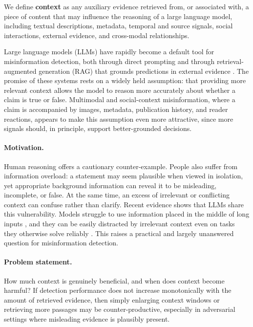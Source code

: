 \documentclass[11pt]{article}
\begin{document}
We define \textbf{context} as any auxiliary evidence retrieved from, or associated with, a piece of content that may influence the reasoning of a large language model, including textual descriptions, metadata, temporal and source signals, social interactions, external evidence, and cross-modal relationships.

Large language models (LLMs) have rapidly become a default tool for misinformation detection, both through direct prompting and through retrieval-augmented generation (RAG) that grounds predictions in external evidence \citep{lewis2020rag,gao2024ragsurvey}. The promise of these systems rests on a widely held assumption: that providing more relevant context allows the model to reason more accurately about whether a claim is true or false. Multimodal and social-context misinformation, where a claim is accompanied by images, metadata, publication history, and reader reactions, appears to make this assumption even more attractive, since more signals should, in principle, support better-grounded decisions.

\paragraph{Motivation.} Human reasoning offers a cautionary counter-example. People also suffer from information overload: a statement may seem plausible when viewed in isolation, yet appropriate background information can reveal it to be misleading, incomplete, or false. At the same time, an excess of irrelevant or conflicting context can confuse rather than clarify. Recent evidence shows that LLMs share this vulnerability. Models struggle to use information placed in the middle of long inputs \citep{liu2024lost}, and they can be easily distracted by irrelevant context even on tasks they otherwise solve reliably \citep{shi2023distracted}. This raises a practical and largely unanswered question for misinformation detection.

\paragraph{Problem statement.} How much context is genuinely beneficial, and when does context become harmful? If detection performance does not increase monotonically with the amount of retrieved evidence, then simply enlarging context windows or retrieving more passages may be counter-productive, especially in adversarial settings where misleading evidence is plausibly present.
\end{document}
